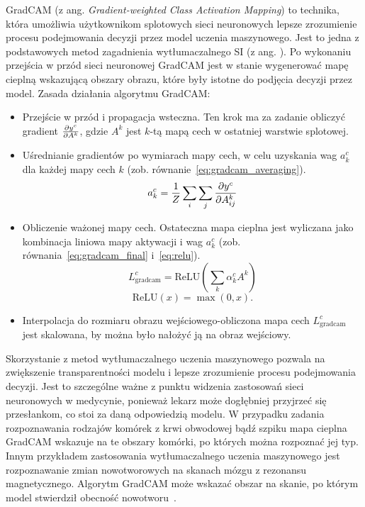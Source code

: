 GradCAM (z ang. \textit{Gradient-weighted Class Activation Mapping}) to technika, która umożliwia użytkownikom splotowych sieci neuronowych lepsze zrozumienie procesu podejmowania decyzji przez model uczenia maszynowego.
Jest to jedna z podstawowych metod zagadnienia wytłumaczalnego SI (z ang. ).
Po wykonaniu przejścia w przód sieci neuronowej GradCAM jest w stanie wygenerować mapę cieplną wskazującą obszary obrazu, które były istotne do podjęcia decyzji przez model.
Zasada działania algorytmu GradCAM:
\begin{itemize}
    \item Przejście w przód i propagacja wsteczna.
    Ten krok ma za zadanie obliczyć gradient $\frac{\partial{{y^c}}}{\partial{{A^k}}}$, gdzie $A^k$ jest $k$-tą mapą cech w ostatniej warstwie splotowej.
    \item Uśrednianie gradientów po wymiarach mapy cech, w celu uzyskania wag $a^c_k$ dla każdej mapy cech $k$ (zob.
    równanie~\ref{eq:gradcam_averaging}).
    \begin{equation}
        a^c_k = \frac{1}{Z} \sum_i \sum_j \frac{\partial{{y^c}}}{\partial{{A^k_{ij}}}}\label{eq:gradcam_averaging}
    \end{equation}
    \item Obliczenie ważonej mapy cech.
    Ostateczna mapa cieplna jest wyliczana jako kombinacja liniowa mapy aktywacji i wag $a^c_k$ (zob.
    równania~\ref{eq:gradcam_final} i~\ref{eq:relu}).
    \begin{equation}
        L^c_{\text{gradcam}} = \text{ReLU} \left( \sum_k \alpha^c_k A^k \right)\label{eq:gradcam_final}
    \end{equation}
    \begin{equation}
        \text{ReLU}(x) = \max(0, x).\label{eq:relu}
    \end{equation}
    \item Interpolacja do rozmiaru obrazu wejściowego-obliczona mapa cech $L^c_{\text{gradcam}}$ jest skalowana, by można było nałożyć ją na obraz wejściowy.
\end{itemize}

Skorzystanie z metod wytłumaczalnego uczenia maszynowego pozwala na zwiększenie transparentności modelu i lepsze zrozumienie procesu podejmowania decyzji.
Jest to szczególne ważne z punktu widzenia zastosowań sieci neuronowych w medycynie, ponieważ lekarz może dogłębniej przyjrzeć się przesłankom, co stoi za daną odpowiedzią modelu.
W przypadku zadania rozpoznawania rodzajów komórek z krwi obwodowej bądź szpiku mapa cieplna GradCAM wskazuje na te obszary komórki, po których można rozpoznać jej typ.
Innym przykładem zastosowania wytłumaczalnego uczenia maszynowego jest rozpoznawanie zmian nowotworowych na skanach mózgu z rezonansu magnetycznego.
Algorytm GradCAM może wskazać obszar na skanie, po którym model stwierdził obecność nowotworu~\cite{gradcam_brain_tumor}.